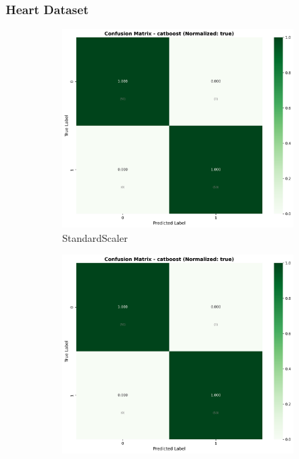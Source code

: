 \FloatBarrier

\subsubsection{Heart Dataset}\label{subsubsec:catboost-heart}

\begin{figure}[H]
\centering
\begin{subfigure}[b]{0.31\textwidth}
\centering
\includegraphics[width=0.95\textwidth]{Result/heart_dataset/confusion_matrices/catboost_numeric_dataset_StandardScaler.png}
\caption{StandardScaler}
\label{fig:cat_heart_cm_standard}
\end{subfigure}\hfill
\begin{subfigure}[b]{0.31\textwidth}
\centering
\includegraphics[width=0.95\textwidth]{Result/heart_dataset/confusion_matrices/catboost_numeric_dataset_MinMaxScaler.png}

\end{subfigure}
\end{figure}
